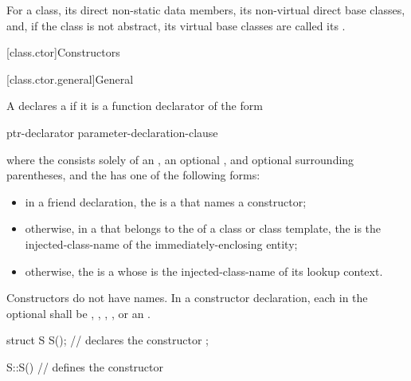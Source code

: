 \pnum
For a class, its direct non-static data members, its non-virtual direct base classes,
and, if the class is not abstract, its virtual base
classes are called its .

[class.ctor]{Constructors}%

[class.ctor.general]{General}%
%
%

\pnum
A  declares a  if it is a
function declarator of the form
\begin{ncbnf}
ptr-declarator \terminal{(} parameter-declaration-clause \terminal{)}  
\end{ncbnf}
where the  consists solely of an
, an optional ,
and optional surrounding parentheses, and the  has
one of the following forms:
\begin{itemize}
\item
in a friend declaration,
the  is a 
that names a constructor;
\item
otherwise, in a  that belongs to the
 of a class or class template,
the  is the
injected-class-name of the immediately-enclosing entity;

\item
otherwise, the
 is a 
whose  is
the injected-class-name of its lookup context.
\end{itemize}
Constructors do not have names.
In a constructor declaration, each  in the optional
 shall be
,
,
,
, or
an .
\begin{example}
\begin{codeblock}
struct S {
  S();              // declares the constructor
};

S::S() { }          // defines the constructor
\end{codeblock}
\end{example}

